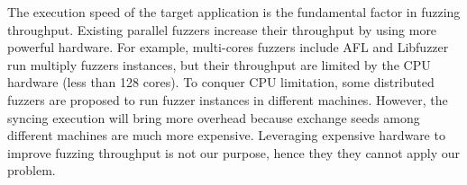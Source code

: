\begin{table}[]
\caption{Comparing different fuzzers in terms of source code requirement, snapshot support, Parallel execution and throughput.}
\label{tab:survey}
\end{table}

The execution speed of the target application is the fundamental factor in fuzzing throughput\cite{fuzzan_atc}. 
Existing parallel fuzzers increase their throughput by using more powerful hardware.
For example, multi-cores fuzzers include AFL and Libfuzzer run multiply fuzzers instances, but their throughput are limited by the CPU hardware (less than 128 cores).
To conquer CPU limitation, some distributed fuzzers\cite{clusterfuzz, distributed_fuzz, wtf} are proposed to run fuzzer instances in different machines. However, the syncing execution will bring more overhead because exchange seeds among different machines are much more expensive.  
Leveraging expensive hardware to improve fuzzing throughput is not our purpose, hence they they cannot apply our problem.


